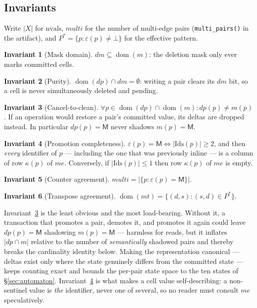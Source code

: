 \documentclass[11pt,a4paper]{article}
\theoremstyle{plain}
\theoremstyle{definition}
\newtheorem{invariant}{Invariant}
\theoremstyle{remark}
\newcommand{\M}{\mathsf{M}}
\newcommand{\dom}{\operatorname{dom}}
\begin{document}
\subsection{Invariants}
\label{sec:invariants}

Write $|X|$ for $\mathrm{nvals}$, $\textit{multi}$ for the number of multi-edge
pairs (\texttt{multi\_pairs()} in the artifact), and
$P^{\ast} = \{p : \varepsilon(p) \neq \bot\}$ for the effective pattern.

\begin{invariant}[Mask domain]\label{inv:masksub}
$dm \subseteq \dom(m)$: the deletion mask only ever marks committed cells.
\end{invariant}
\begin{invariant}[Purity]\label{inv:pure}
$\dom(dp) \cap dm = \emptyset$: writing a pair clears its $dm$ bit, so a cell
is never simultaneously deleted and pending.
\end{invariant}
\begin{invariant}[Cancel-to-clean]\label{inv:cancel}
$\forall p \in \dom(dp) \cap \dom(m): dp(p) \neq m(p)$. If an operation would
restore a pair's committed value, its deltas are dropped instead. In
particular $dp(p) = \M$ never shadows $m(p) = \M$.
\end{invariant}
\begin{invariant}[Promotion completeness]\label{inv:promotion}
$\varepsilon(p) = \M \iff |\mathrm{Ids}(p)| \ge 2$, and then \emph{every}
identifier of $p$ --- including the one that was previously inline --- is a
column of row $\kappa(p)$ of $me$. Conversely, if
$|\mathrm{Ids}(p)| \le 1$ then row $\kappa(p)$ of $me$ is empty.
\end{invariant}
\begin{invariant}[Counter agreement]\label{inv:counter}
$\textit{multi} = |\{p : \varepsilon(p) = \M\}|$.
\end{invariant}
\begin{invariant}[Transpose agreement]\label{inv:mt}
$\dom(mt) = \{(d,s) : (s,d) \in P^{\ast}\}$.
\end{invariant}

Invariant~\ref{inv:cancel} is the least obvious and the most load-bearing.
Without it, a transaction that promotes a pair, demotes it, and promotes it
again could leave $dp(p) = \M$ shadowing $m(p) = \M$ --- harmless for reads,
but it inflates $|dp \cap m|$ relative to the number of \emph{semantically}
shadowed pairs and thereby breaks the cardinality identity below. Making the
representation canonical --- deltas exist only where the state genuinely
differs from the committed state --- keeps counting exact and bounds the
per-pair state space to the ten states of \S\ref{sec:automaton}.
Invariant~\ref{inv:promotion} is what makes a cell value self-describing: a
non-sentinel value is \emph{the} identifier, never one of several, so no
reader must consult $me$ speculatively.
\end{document}

